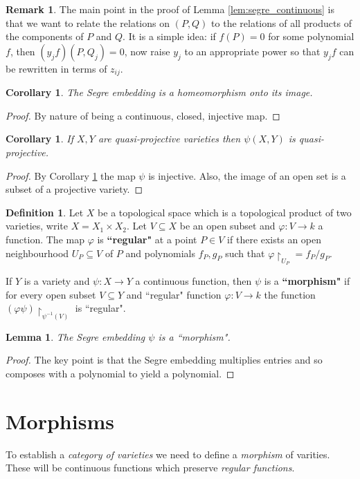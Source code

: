 \documentclass[12pt]{article}
\theoremstyle{plain}
\newtheorem{lemma}[thm]{Lemma}
\newtheorem{cor}[thm]{Corollary}
\theoremstyle{definition}
\newtheorem{defn}[thm]{Definition} %
\newtheorem{remark}[thm]{Remark}
\newcommand{\lto}{\longrightarrow}
\begin{document}
\begin{remark}
The main point in the proof of Lemma \ref{lem:segre_continuous} is that we want to relate the relations on $(P,Q)$ to the relations of all products of the components of $P$ and $Q$. It is a simple idea: if $f(P) = 0$ for some polynomial $f$, then $(y_jf)(P,Q_j) = 0$, now raise $y_j$ to an appropriate power so that $y_jf$ can be rewritten in terms of $z_{ij}$.
\end{remark}
\begin{cor}\label{cor:homeo}
The Segre embedding is a homeomorphism onto its image.
\end{cor}
\begin{proof}
By nature of being a continuous, closed, injective map.
\end{proof}
\begin{cor}
If $X,Y$ are quasi-projective varieties then $\psi(X, Y)$ is quasi-projective.
\end{cor}
\begin{proof}
By Corollary \ref{cor:homeo} the map $\psi$ is injective. Also, the image of an open set is a subset of a projective variety.
\end{proof}
\begin{defn}
Let $X$ be a topological space which is a topological product of two varieties, write $X = X_1 \times X_2$. Let $V \subseteq X$ be an open subset and $\varphi: V \lto k$ a function. The map $\varphi$ is \textbf{``regular"} at a point $P \in V$ if there exists an open neighbourhood $U_P \subseteq V$ of $P$ and polynomials $f_P,g_P$ such that $\varphi\restriction_{U_P} = f_P/g_P$.

If $Y$ is a variety and $\psi: X \lto Y$ a continuous function, then $\psi$ is a \textbf{``morphism"} if for every open subset $V \subseteq Y$ and ``regular" function $\varphi: V \lto k$ the function $(\varphi \psi)\restriction_{\psi^{-1}(V)}$ is ``regular".
\end{defn}
\begin{lemma}
The Segre embedding $\psi$ is a ``morphism".
\end{lemma}
\begin{proof}
The key point is that the Segre embedding multiplies entries and so composes with a polynomial to yield a polynomial.
\end{proof}


\section{Morphisms}
To establish a \emph{category of varieties} we need to define a \emph{morphism} of varities. These will be continuous functions which preserve \emph{regular functions}.
\end{document}
